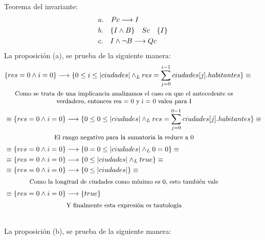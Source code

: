 \documentclass[10pt,a4paper,fleqn]{article}
\begin{document}
\indent
Teorema del invariante:\\
\begin{align*}
    &a.\quad Pc \longrightarrow I\\
    &b.\quad \{ I \land B \} \quad Sc \quad \{ I \}\\
    &c.\quad I \land \neg B \longrightarrow Qc\\
\end{align*}
\indent
La proposición (a), se prueba de la siguiente manera:
\begin{align*}
    &\{ res = 0 \land i = 0 \} \implica \{\invariante{i}\} \equiv \\
    \shortintertext{\parbox{\textwidth}{\centering \small {Como se trata de una implicancia analizamos el caso en que el antecedente es verdadero, entonces res = 0 y i = 0 valen para I}}} \notag
    &\equiv\{ res = 0 \land i = 0 \} \implica \{ \invariante{0} \} \equiv\\
    \shortintertext{\parbox{\textwidth}{\centering \small {El rango negativo para la sumatoria la reduce a 0}}} \notag
    &\equiv\{ res = 0 \land i = 0 \} \implica \{ 0 = 0 \leq |ciudades| \yLuego 0 = 0 \} \equiv\\
    &\equiv\{ res = 0 \land i = 0 \} \implica \{ 0 \leq |ciudades| \yLuego true \} \equiv\\
    &\equiv\{ res = 0 \land i = 0 \} \implica \{ 0 \leq |ciudades| \} \equiv\\
    \shortintertext{\parbox{\textwidth}{\centering \small {Como la longitud de ciudades como mínimo es 0, esto también vale}}} \notag
    &\equiv\{ res = 0 \land i = 0 \} \implica \{ true \} \\
    \shortintertext{\parbox{\textwidth}{\centering \small {Y finalmente esta expresión es tautología}}} \notag
\end{align*}
\indent
La proposición (b), se prueba de la siguiente manera:
\end{document}
